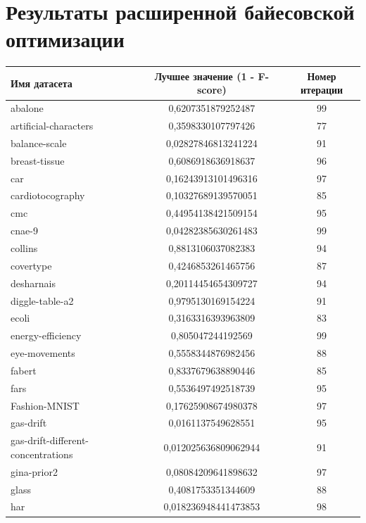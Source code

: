 \documentclass[times,specification,annotation]{itmo-student-thesis}
\begin{document}
\chapter{Результаты расширенной байесовской оптимизации}\label{app:pbo-results}
\begin{center} 
	\begin{longtable}{ |m{5cm}|c|c| } 
		\hline
		\textbf{Имя датасета} & \textbf{Лучшее значение (1 - F-score)} & \textbf{Номер итерации} \\
		\hline\hline
		abalone & 0,6207351879252487 & 99 \\
		\hline
		artificial-characters & 0,3598330107797426 & 77 \\
		\hline
		balance-scale & 0,02827846813241224 & 91 \\
		\hline
		breast-tissue & 0,6086918636918637 & 96 \\
		\hline
		car & 0,16243913101496316 & 97 \\
		\hline
		cardiotocography & 0,10327689139570051 & 85 \\
		\hline
		cmc & 0,44954138421509154 & 95 \\
		\hline
		cnae-9 & 0,04282385630261483 & 99 \\
		\hline
		collins & 0,8813106037082383 & 94 \\
		\hline
		covertype & 0,4246853261465756 & 87 \\
		\hline
		desharnais & 0,20114454654309727 & 94 \\
		\hline
		diggle-table-a2 & 0,9795130169154224 & 91 \\
		\hline
		ecoli & 0,3163316393963809 & 83 \\
		\hline
		energy-efficiency & 0,805047244192569 & 99 \\
		\hline
		eye-movements & 0,5558344876982456 & 88 \\
		\hline
		fabert & 0,8337679638890446 & 85 \\
		\hline
		fars & 0,5536497492518739 & 95 \\
		\hline
		Fashion-MNIST & 0,17625908674980378 & 97 \\
		\hline
		gas-drift & 0,0161137549628551 & 95 \\
		\hline
		gas-drift-different-concentrations & 0,012025636809062944 & 91 \\
		\hline
		gina-prior2 & 0,08084209641898632 & 97 \\
		\hline
		glass & 0,4081753351344609 & 88 \\
		\hline
		har & 0,018236948441473853 & 98 \\

\end{longtable}
\end{center}
\end{document}
